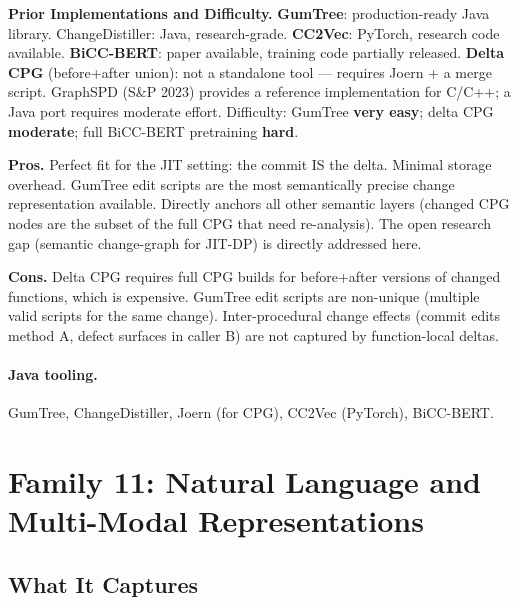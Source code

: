 \documentclass[12pt,a4paper]{article}
\begin{document}
\begin{implbox}
\textbf{Prior Implementations and Difficulty.}
\textbf{GumTree}: production-ready Java library. ChangeDistiller: Java,
research-grade.
\textbf{CC2Vec}: PyTorch, research code available.
\textbf{BiCC-BERT}: paper available, training code partially released.
\textbf{Delta CPG} (before+after union): not a standalone tool --- requires
Joern + a merge script. GraphSPD (S\&P 2023) provides a reference implementation
for C/C++; a Java port requires moderate effort.
Difficulty: GumTree \textbf{very easy}; delta CPG \textbf{moderate};
full BiCC-BERT pretraining \textbf{hard}.
\end{implbox}

\begin{prosbox}
\textbf{Pros.}
Perfect fit for the JIT setting: the commit IS the delta. Minimal storage
overhead. GumTree edit scripts are the most semantically precise change
representation available. Directly anchors all other semantic layers
(changed CPG nodes are the subset of the full CPG that need re-analysis).
The open research gap (semantic change-graph for JIT-DP) is directly addressed
here.
\end{prosbox}

\begin{consbox}
\textbf{Cons.}
Delta CPG requires full CPG builds for before+after versions of changed
functions, which is expensive. GumTree edit scripts are non-unique (multiple
valid scripts for the same change). Inter-procedural change effects (commit
edits method A, defect surfaces in caller B) are not captured by
function-local deltas.
\end{consbox}

\paragraph{Java tooling.} GumTree, ChangeDistiller, Joern (for CPG),
CC2Vec (PyTorch), BiCC-BERT.

\section{Family 11: Natural Language and Multi-Modal Representations}

\subsection{What It Captures}
\end{document}
